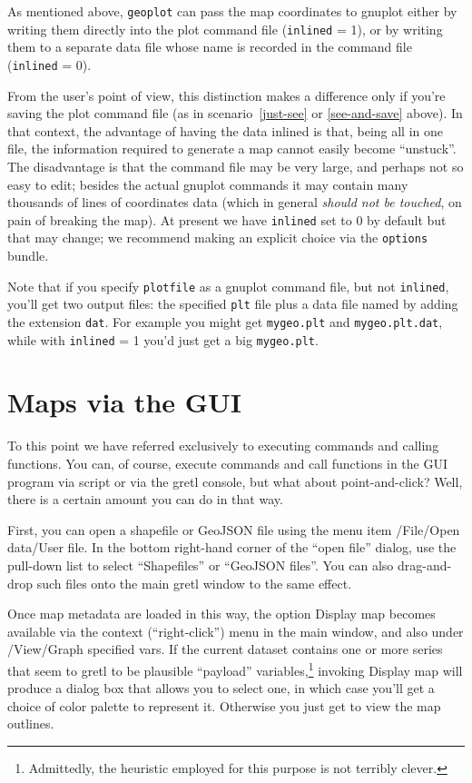 \documentclass{article}
\begin{document}
As mentioned above, \texttt{geoplot} can pass the map coordinates to
\textsf{gnuplot} either by writing them directly into the plot command
file (\texttt{inlined} = 1), or by writing them to a separate data
file whose name is recorded in the command file (\texttt{inlined} =
0).

From the user's point of view, this distinction makes a difference
only if you're saving the plot command file (as in
scenario~\ref{just-see} or \ref{see-and-save} above).  In that
context, the advantage of having the data inlined is that, being all
in one file, the information required to generate a map cannot easily
become ``unstuck''. The disadvantage is that the command file may be
very large, and perhaps not so easy to edit; besides the actual
\textsf{gnuplot} commands it may contain many thousands of lines of
coordinates data (which in general \textit{should not be touched}, on
pain of breaking the map). At present we have \texttt{inlined} set to
0 by default but that may change; we recommend making an explicit
choice via the \texttt{options} bundle.

Note that if you specify \texttt{plotfile} as a \textsf{gnuplot}
command file, but not \texttt{inlined}, you'll get two output files:
the specified \texttt{plt} file plus a data file named by adding the
extension \texttt{dat}. For example you might get \texttt{mygeo.plt}
and \texttt{mygeo.plt.dat}, while with \texttt{inlined} = 1 you'd just
get a big \texttt{mygeo.plt}.

\section{Maps via the GUI}
\label{sec:gui}

To this point we have referred exclusively to executing commands and
calling functions. You can, of course, execute commands and call
functions in the GUI program via script or via the gretl console, but
what about point-and-click? Well, there is a certain amount you can do
in that way.

First, you can open a shapefile or GeoJSON file using the menu item
\textsf{/File/Open data/User file}. In the bottom right-hand corner of
the ``open file'' dialog, use the pull-down list to select
``Shapefiles'' or ``GeoJSON files''. You can also drag-and-drop such
files onto the main gretl window to the same effect.

Once map metadata are loaded in this way, the option \textsf{Display
  map} becomes available via the context (``right-click'') menu in the
main window, and also under \textsf{/View/Graph specified vars}. If
the current dataset contains one or more series that seem to gretl to
be plausible ``payload'' variables,\footnote{Admittedly, the heuristic
  employed for this purpose is not terribly clever.} invoking
\textsf{Display map} will produce a dialog box that allows you to
select one, in which case you'll get a choice of color palette to
represent it. Otherwise you just get to view the map outlines.
\end{document}
